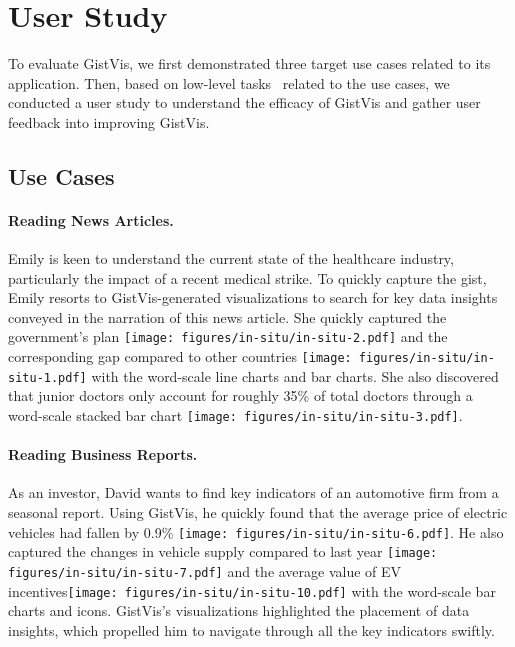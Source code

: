 \section{User Study}
\label{sec:eval-user-study}
To evaluate GistVis, we first demonstrated three target use cases related to its application. Then, based on low-level tasks~\cite{amar2005lowlevel} related to the use cases, we conducted a user study to understand the efficacy of GistVis and gather user feedback into improving GistVis.

\subsection{Use Cases}
\paragraph{Reading News Articles.}
Emily is keen to understand the current state of the healthcare industry, particularly the impact of a recent medical strike. To quickly capture the gist, Emily resorts to GistVis-generated visualizations to search for key data insights conveyed in the narration of this news article. She quickly captured the government's plan \texttt{[image: figures/in-situ/in-situ-2.pdf]} and the corresponding gap compared to other countries \texttt{[image: figures/in-situ/in-situ-1.pdf]} with the word-scale line charts and bar charts. She also discovered that junior doctors only account for roughly 35\% of total doctors through a word-scale stacked bar chart \texttt{[image: figures/in-situ/in-situ-3.pdf]}.

\paragraph{Reading Business Reports.}
As an investor, David wants to find key indicators of an automotive firm from a seasonal report. Using GistVis, he quickly found that the average price of electric vehicles had fallen by 0.9\% \texttt{[image: figures/in-situ/in-situ-6.pdf]}. He also captured the changes in vehicle supply compared to last year \texttt{[image: figures/in-situ/in-situ-7.pdf]} and the average value of EV incentives\texttt{[image: figures/in-situ/in-situ-10.pdf]} with the word-scale bar charts and icons. GistVis's visualizations highlighted the placement of data insights, which propelled him to navigate through all the key indicators swiftly. 


